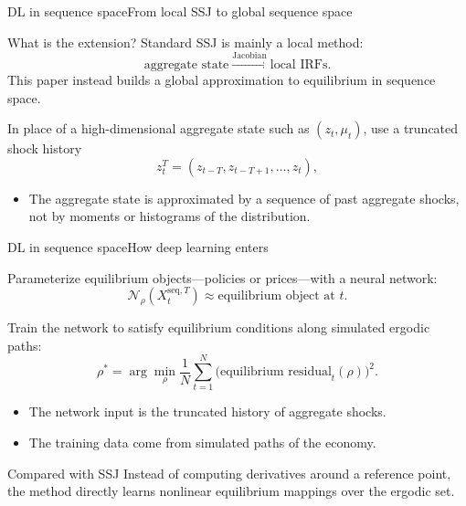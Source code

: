 \documentclass[aspectratio=169]{beamer}
\begin{document}
\begin{frame}{DL in sequence space}{From local SSJ to global sequence space}
\small

\begin{block}{What is the extension?}
Standard SSJ is mainly a \alert{local} method:
\[
\text{aggregate state} \xrightarrow{\text{Jacobian}} \text{local IRFs}.
\]
This paper instead builds a \alert{global approximation} to equilibrium in sequence space.
\end{block}

In place of a high-dimensional aggregate state such as $(z_t,\mu_t)$, use a truncated shock history
\[
z_t^T=(z_{t-T},z_{t-T+1},\ldots,z_t),
\]

\begin{itemize}
    \item The aggregate state is approximated by a \alert{sequence of past aggregate shocks},
    not by moments or histograms of the distribution.
\end{itemize}

\end{frame}

\begin{frame}{DL in sequence space}{How deep learning enters}
\small

Parameterize equilibrium objects---policies or prices---with a neural network:
\[
\mathcal N_\rho(X_t^{\text{seq},T}) \approx \text{equilibrium object at } t.
\]

Train the network to satisfy equilibrium conditions along simulated ergodic paths:
\[
\rho^*
=
\arg\min_\rho
\frac{1}{N}\sum_{t=1}^N
\big(\text{equilibrium residual}_t(\rho)\big)^2 .
\]

\begin{itemize}
    \item The network input is the truncated history of aggregate shocks.
    \item The training data come from simulated paths of the economy.
\end{itemize}

\begin{alertblock}{Compared with SSJ}
Instead of computing \alert{derivatives} around a reference point, the method directly learns
\alert{nonlinear equilibrium mappings} over the ergodic set.
\end{alertblock}

\end{frame}
\end{document}
